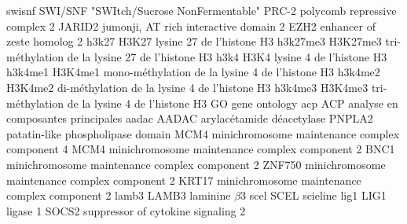 %
\newacronym
	{swisnf}
	{SWI/SNF}
	{"SWItch/Sucrose NonFermentable"}
	{PRC-2}
	{polycomb repressive complex 2}
	{JARID2}
	{jumonji, AT rich interactive domain 2}
	{EZH2}
	{enhancer of zeste homolog 2}
%
\newacronym
	{h3k27}
	{H3K27}
	{lysine 27 de l'histone H3}
\newacronym
	{h3k27me3}
	{H3K27me3}
	{tri-méthylation de la lysine 27 de l'histone H3}
\newacronym
	{h3k4}
	{H3K4}
	{lysine 4 de l'histone H3}
\newacronym
	{h3k4me1}
	{H3K4me1}
	{mono-méthylation de la lysine 4 de l'histone H3}
\newacronym
	{h3k4me2}
	{H3K4me2}
	{di-méthylation de la lysine 4 de l'histone H3}
\newacronym
	{h3k4me3}
	{H3K4me3}
	{tri-méthylation de la lysine 4 de l'histone H3}
%
	{GO}
	{gene ontology}
\newacronym
	{acp}
	{ACP}
	{analyse en composantes principales}
%
\newacronym
	{aadac}
	{AADAC}
	{arylacétamide déacetylase}
	{PNPLA2}
	{patatin-like phospholipase domain}
	{MCM4}
	{minichromosome maintenance complex component 4}
	{MCM4}
	{minichromosome maintenance complex component 2}
	{BNC1}
	{minichromosome maintenance complex component 2}
	{ZNF750}
	{minichromosome maintenance complex component 2}
	{KRT17}
	{minichromosome maintenance complex component 2}
\newacronym
	{lamb3}
	{LAMB3}
	{laminine $\beta$3}
\newacronym
	{scel}
	{SCEL}
	{scieline}
\newacronym
	{lig1}
	{LIG1}
	{ligase 1}
	{SOCS2}
	{suppressor of cytokine signaling 2}